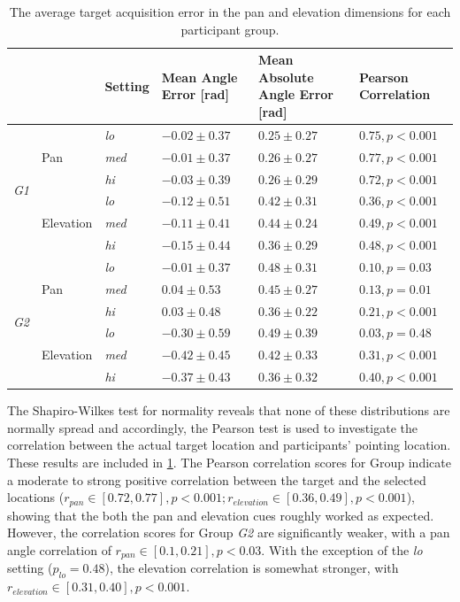 \documentclass{article}
\begin{document}
\begin{table}
  \centering
  \caption{The average target acquisition error in the pan and elevation dimensions for each participant group. }\label{tab:target-results}
  \begin{tabular}{p{0.5cm}p{1.3cm}p{0.9cm}p{2cm}p{2cm}p{2.25cm}}
    \toprule
    &           & Setting      & Mean Angle Error [rad] & Mean Absolute Angle Error [rad] &  Pearson Correlation \\ \midrule
    \multirow{6}{*}{\textit{G1}}
    &           & \textit{lo}  & $-0.02\pm0.37$ & $0.25\pm0.27$ & $0.75, p < 0.001$ \\
    & Pan       & \textit{med} & $-0.01\pm0.37$ & $0.26\pm0.27$ & $0.77, p < 0.001$ \\
    &           & \textit{hi}  & $-0.03\pm0.39$ & $0.26\pm0.29$ & $0.72, p < 0.001$ \\ \cline{2-6}
    &           & \textit{lo}  & $-0.12\pm0.51$ & $0.42\pm0.31$ & $0.36, p < 0.001$ \\
    & Elevation & \textit{med} & $-0.11\pm0.41$ & $0.44\pm0.24$ & $0.49, p < 0.001$ \\
    &           & \textit{hi}  & $-0.15\pm0.44$ & $0.36\pm0.29$ & $0.48, p < 0.001$ \\ \midrule
    \multirow{6}{*}{\textit{G2}}
    &           & \textit{lo}  & $-0.01\pm0.37$ & $0.48\pm0.31$ & $0.10, p = 0.03$  \\
    & Pan       & \textit{med} & $ 0.04\pm0.53$ & $0.45\pm0.27$ & $0.13, p = 0.01$  \\
    &           & \textit{hi}  & $ 0.03\pm0.48$ & $0.36\pm0.22$ & $0.21, p < 0.001$ \\\cline{2-6}
    &           & \textit{lo}  & $-0.30\pm0.59$ & $0.49\pm0.39$ & $0.03, p = 0.48$  \\
    & Elevation & \textit{med} & $-0.42\pm0.45$ & $0.42\pm0.33$ & $0.31, p < 0.001$ \\
    &           & \textit{hi}  & $-0.37\pm0.43$ & $0.36\pm0.32$ & $0.40, p < 0.001$ \\ 
    \bottomrule
  \end{tabular}
\end{table}

The Shapiro-Wilkes test for normality reveals that none of these distributions are normally spread and accordingly, the Pearson test is used to investigate the correlation between the actual target location and participants' pointing location.
These results are included in \cref{tab:target-results}.
The Pearson correlation scores for Group  indicate a moderate to strong positive correlation between the target and the selected locations ($r_{pan} \in [0.72, 0.77], p < 0.001; r_{elevation} \in [0.36, 0.49], p < 0.001$), showing that the both the pan and elevation cues roughly worked as expected.
However, the correlation scores for Group \textit{G2} are significantly weaker, with a pan angle correlation of $r_{pan} \in [0.1, 0.21], p < 0.03$.
With the exception of the \textit{lo} setting ($p_{lo} = 0.48$), the elevation correlation is somewhat stronger, with $r_{elevation} \in [0.31, 0.40], p < 0.001$.
\end{document}
